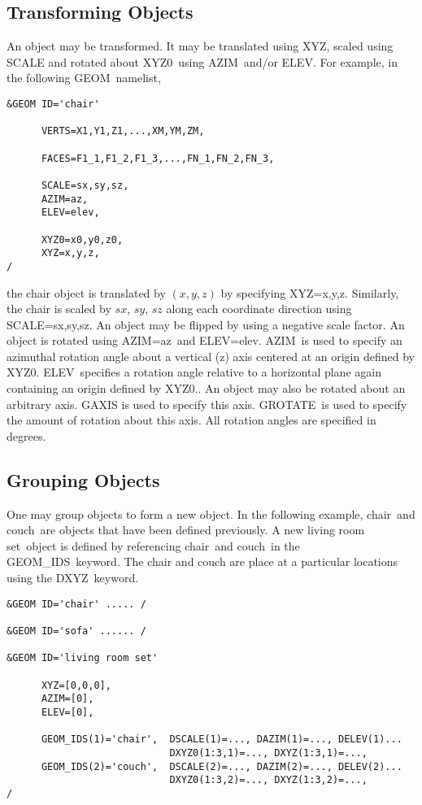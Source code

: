 \documentclass[12pt]{article}
\begin{document}
\subsection{Transforming Objects}
An object may be transformed.
It  may be translated using {\ct XYZ}, scaled using {\ct SCALE} and rotated about {\ct XYZ0}\ using {\ct AZIM}\ and/or {\ct ELEV}.
For example, in the following {\ct GEOM}\ namelist,

{\small
\begin{verbatim}
&GEOM ID='chair'

      VERTS=X1,Y1,Z1,...,XM,YM,ZM,

      FACES=F1_1,F1_2,F1_3,...,FN_1,FN_2,FN_3,

      SCALE=sx,sy,sz,
      AZIM=az,
      ELEV=elev,

      XYZ0=x0,y0,z0,
      XYZ=x,y,z,
/
\end{verbatim}
}

\noindent the chair object is translated by $(x,y,z)$ by specifying {\ct XYZ=x,y,z}.
Similarly, the chair is scaled by $sx$, $sy$, $sz$ along each coordinate direction using {\ct SCALE=sx,sy,sz}.
An object may be flipped by using a negative scale factor.
An object is rotated using {\ct AZIM=az}\ and {\ct ELEV=elev}.
{\ct AZIM}\ is used to specify an azimuthal rotation angle about a vertical (z) axis centered at an origin defined by {\ct XYZ0}.
{\ct ELEV}\ specifies a rotation angle relative to a horizontal plane again containing an origin defined by {\ct XYZ0}..
An object may also be rotated about an arbitrary axis.
{\ct GAXIS} is used to specify this axis.
{\ct GROTATE}\ is used to specify the amount of rotation about this axis.
All rotation angles are specified in degrees.

\subsection{Grouping Objects}
One may group objects to form a new object.  In the following example,
{\ct chair}\ and {\ct couch}\ are objects that have been defined previously.  A new {\ct living room set}\ object
is defined by referencing {\ct chair}\ and {\ct couch}\ in the {\ct GEOM\_IDS}\ keyword.  The chair and couch
are place at a particular locations using the {\ct DXYZ}\ keyword.

{\small
\begin{verbatim}
&GEOM ID='chair' ..... /

&GEOM ID='sofa' ...... /

&GEOM ID='living room set'

      XYZ=[0,0,0],
      AZIM=[0],
      ELEV=[0],

      GEOM_IDS(1)='chair',  DSCALE(1)=..., DAZIM(1)=..., DELEV(1)...
                            DXYZ0(1:3,1)=..., DXYZ(1:3,1)=...,
      GEOM_IDS(2)='couch',  DSCALE(2)=..., DAZIM(2)=..., DELEV(2)...
                            DXYZ0(1:3,2)=..., DXYZ(1:3,2)=...,
/
\end{verbatim}
}
\end{document}
